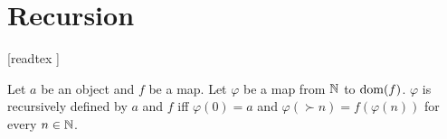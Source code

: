 \documentclass[../arithmetic.tex]{subfiles}
\begin{document}
  \chapter{Recursion}\label{chapter:recursion}


  \begin{forthel}

    [readtex ]

  \end{forthel}


  \begin{forthel}
    \begin{definition}
      Let $a$ be an object and $f$ be a map.
      Let $\varphi$ be a map from $\mathbb{N}$ to $\operatorname{dom}(f)$.
      $\varphi$ is recursively defined by $a$ and $f$ iff $\varphi(0) = a$ and
      $\varphi(\succ{n}) = f(\varphi(n))$ for every $n \in \mathbb{N}$.
    \end{definition}
  \end{forthel}
\end{document}
